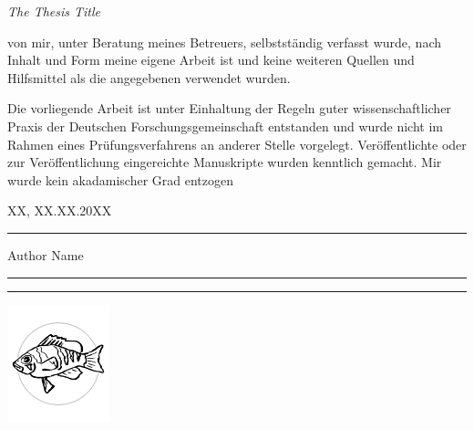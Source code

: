 \documentclass[12pt, openany]{book}
\def\MYTITLE{The Thesis Title}
\def\MYAUTHOR{Author Name}
\begin{document}
\textit{\MYTITLE}\vspace{1em}

von mir, unter Beratung meines Betreuers, selbstständig verfasst wurde, nach Inhalt und Form meine eigene Arbeit ist und keine weiteren Quellen und Hilfsmittel als die angegebenen verwendet wurden.

\noindent{}Die vorliegende Arbeit ist unter Einhaltung der Regeln guter wissenschaftlicher Praxis der Deutschen Forschungsgemeinschaft entstanden und wurde nicht im Rahmen eines Prüfungsverfahrens an anderer Stelle vorgelegt.
Veröffentlichte oder zur Veröffentlichung eingereichte Manuskripte wurden kenntlich gemacht.
Mir wurde kein akadamischer Grad entzogen\\\vspace{.07\paperheight}

\noindent{}XX, XX.XX.20XX\hfill{}\rule{.25\textwidth}{0.4pt}

\hfill{}\MYAUTHOR\hspace*{.04\textwidth}\\

\newpage
{}
\thispagestyle{empty}
\textcolor{white!90}{\hrule}\vspace*{1em}
\vfill

\textcolor{white!90}{\hrule}\vspace*{.15em}
\hfil\includegraphics[width = 8em]{images/logo.pdf}
\end{document}
